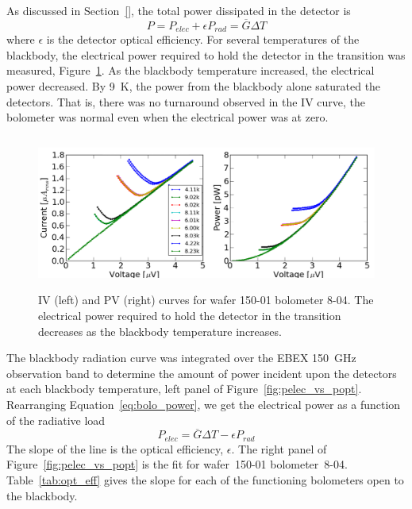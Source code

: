 As discussed in Section~\ref{}, the total power dissipated in the detector is
\begin{equation}
P = P_{elec} + \epsilon P_{rad} = \overline{G} \Delta T
\label{eq:bolo_power}
\end{equation}
where $\epsilon$ is the detector optical efficiency. 
For several temperatures of the blackbody, the electrical power required to hold the detector in the transition was measured, Figure~\ref{fig:opt_eff_bb_curves}.
As the blackbody temperature increased, the electrical power decreased.  
By 9~K, the power from the blackbody alone saturated the detectors. 
That is, there was no turnaround observed in the IV curve, the bolometer was normal even when the electrical power was at zero. 

\begin{figure}[htp]
\begin{center}
\includegraphics[height=2in]{figures/SqCh2_Ch1_all_bb_curves.png}
\caption{IV (left) and PV (right) curves for wafer 150-01 bolometer 8-04. The electrical power required to hold the detector in the transition decreases as the blackbody temperature increases. 
\label{fig:opt_eff_bb_curves} }
\end{center}
\end{figure}

The blackbody radiation curve was integrated over the \ac{EBEX} 150~GHz observation band to determine the amount of power incident upon the detectors at each blackbody temperature, left panel of Figure~\ref{fig:pelec_vs_popt}.
Rearranging Equation~\ref{eq:bolo_power}, we get the electrical power as a function of the radiative load
\begin{equation}
P_{elec} = \overline{G} \Delta T -  \epsilon P_{rad} 
\end{equation}
The slope of the line is the optical efficiency, $\epsilon$.
The right panel of Figure~\ref{fig:pelec_vs_popt} is the fit for wafer~150-01 bolometer~8-04. 
Table~\ref{tab:opt_eff} gives the slope for each of the functioning bolometers open to the blackbody. 

